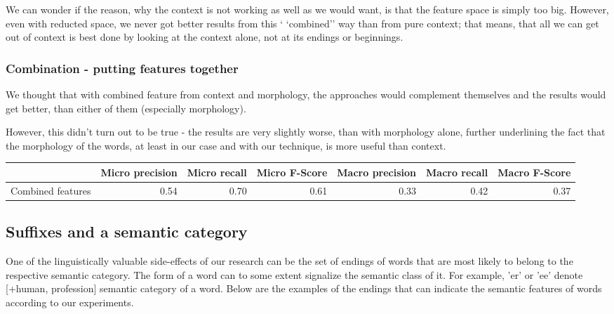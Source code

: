 \documentclass[letterpaper]{article}
\begin{document}

We can wonder if the reason, why the context is not working as 
well as we would want, is that the feature space is simply too big. 
However, even with reducted space, we never got better results from this `
`combined'' way than from pure context; that means, that all we can get out of context 
is best done by looking at the context alone, not at its endings or beginnings.

\subsubsection{Combination - putting features together}
We thought that with combined feature from context and morphology, the approaches would complement 
themselves and the results would get better, than either of them (especially morphology).

However, this didn't turn out to be true - the results are very slightly worse, than with morphology alone, 
further underlining the fact that the morphology of the words, at least in our case and with our technique, 
is more useful than context.

\begin{tabular}{|r|r|r|r|r|r|r|}
 \hline
 & \textbf{Micro precision} &  \textbf{Micro recall}  &  \textbf{Micro F-Score} & \textbf{Macro precision} &  \textbf{Macro recall}  &  \textbf{Macro F-Score} \\ \hline
Combined features & 0.54 & 0.70 & 0.61 & 0.33 & 0.42 & 0.37 \\ \hline
\end{tabular}


\subsection{Suffixes and a semantic category}
One of the linguistically valuable side-effects of our research can be 
the set of endings of words that are most likely to belong to the
respective semantic category.
The form of a word can to some extent signalize the semantic class of it. 
For example, 'er' or 'ee' denote [+human, profession] semantic category of a word.
Below are the examples of the endings that
can indicate the semantic features of words according to our experiments.
\end{document}

